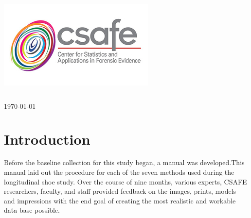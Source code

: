 \begin{titlepage}

\includegraphics[scale=.5]{Logo}\\[1cm]

\begin{center}
\begin{tabular}{ c   |   c } 
 
\end{tabular}
\end{center}

{\large \today}\\[2cm] %



\vfill %

\end{titlepage}

\tableofcontents

\newpage



\section{Introduction}

Before the baseline collection for this study began, a manual was developed.This manual laid out the procedure for each of the seven methods used during the longitudinal shoe study. Over the course of nine months, various experts, CSAFE researchers, faculty, and staff provided feedback on the images, prints, models and impressions with the end goal of creating the most realistic and workable data base possible. 

